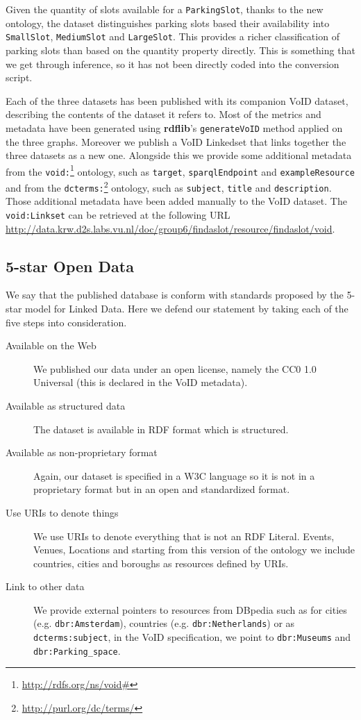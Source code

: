 \documentclass[runningheads,a4paper]{../../StyleFiles/llncs}
\begin{document}
Given the quantity of slots available for a \texttt{ParkingSlot}, thanks to the
new ontology, the dataset distinguishes parking slots based their availability
into \texttt{SmallSlot}, \texttt{MediumSlot} and \texttt{LargeSlot}. This
provides a richer classification of parking slots than based on the quantity
property directly. This is something that we get through inference, so it has
not been directly coded into the conversion script.

Each of the three datasets has been published with its companion VoID dataset,
describing the contents of the dataset it refers to. Most of the metrics and
metadata have been generated using \textbf{rdflib}'s \texttt{generateVoID}
method applied on the three graphs.
Moreover we publish a VoID Linkedset that links together the three datasets as a
new one. Alongside this we provide some additional metadata from the
\texttt{void:}\footnote{\url{http://rdfs.org/ns/void#}} ontology, such as
\texttt{target}, \texttt{sparqlEndpoint} and
\texttt{exampleResource} and from the
\texttt{dcterms:}\footnote{\url{http://purl.org/dc/terms/}} ontology, such as
\texttt{subject}, \texttt{title} and
\texttt{description}. Those additional metadata have been added manually
to the VoID dataset. The \texttt{void:Linkset} can be retrieved at the following
URL \url{http://data.krw.d2s.labs.vu.nl/doc/group6/findaslot/resource/findaslot/void}.

\subsection{5-star Open Data}
We say that the published database is conform with standards proposed by the
5-star model for Linked Data. Here we defend our statement by taking each of the
five steps into consideration.

\begin{description}
\item[Available on the Web] We published our data under an open license,
namely the CC0 1.0 Universal (this is declared in the VoID metadata).
\item[Available as structured data] The dataset is available in RDF
format which is structured.
\item[Available as non-proprietary format] Again, our dataset is specified
in a W3C language so it is not in a proprietary format but in an
open and standardized format.
\item[Use URIs to denote things] We use URIs to denote everything that is
not an RDF Literal. Events, Venues, Locations and starting from this version of
the ontology we include countries, cities and boroughs as resources defined by
URIs.
\item[Link to other data] We provide external pointers to resources from
DBpedia such as for cities (e.g. \texttt{dbr:Amsterdam}), countries (e.g.
\texttt{dbr:Netherlands}) or as \texttt{dcterms:subject}, in the VoID
specification, we point to \texttt{dbr:Museums} and \texttt{dbr:Parking\_space}.
\end{description}
\end{document}
